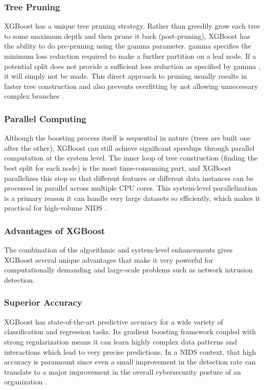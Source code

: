 \subsubsection{Tree Pruning} 
XGBoost has a unique tree pruning strategy. Rather than greedily grow each tree to some maximum depth and then prune it back (post-pruning), XGBoost has the ability to do pre-pruning using the gamma parameter. gamma specifies the minimum loss reduction required to make a further partition on a leaf node. If a potential split does not provide a sufficient loss reduction as specified by gamma , it will simply not be made. This direct approach to pruning usually results in faster tree construction and also prevents overfitting by not allowing unnecessary complex branches \parencite{chen2016xgboost}.

\subsubsection{Parallel Computing} 
Although the boosting process itself is sequential in nature (trees are built one after the other), XGBoost can still achieve significant speedups through parallel computation at the system level. The inner loop of tree construction (finding the best split for each node) is the most time-consuming part, and XGBoost parallelizes this step so that different features or different data instances can be processed in parallel across multiple CPU cores. This system-level parallelization is a primary reason it can handle very large datasets so efficiently, which makes it practical for high-volume NIDS \parencite{agrawal2021survey}.

\subsubsection{Advantages of XGBoost} 
The combination of the algorithmic and system-level enhancements gives XGBoost several unique advantages that make it very powerful for computationally demanding and large-scale problems such as network intrusion detection.

\subsubsection{Superior Accuracy} 
XGBoost has state-of-the-art predictive accuracy for a wide variety of classification and regression tasks. Its gradient boosting framework coupled with strong regularization means it can learn highly complex data patterns and interactions which lead to very precise predictions. In a NIDS context, that high accuracy is paramount since even a small improvement in the detection rate can translate to a major improvement in the overall cybersecurity posture of an organization \parencite{aldhubaib2024network}.

